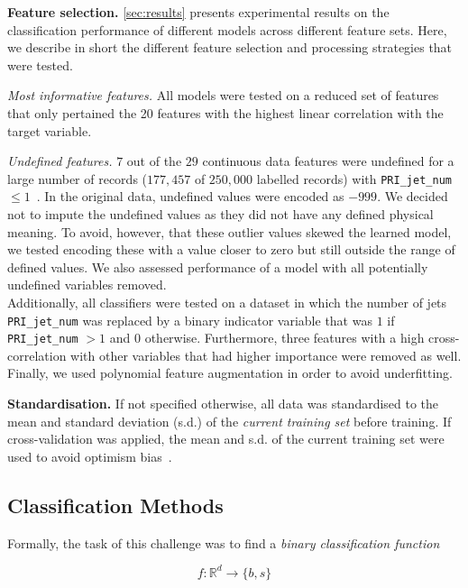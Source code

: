 \documentclass[10pt,conference,compsocconf]{IEEEtran}
\newcommand{\parabf}[1]{\vspace{1mm}\noindent\textbf{#1}}
\newcommand{\parait}[1]{\vspace{1mm}\noindent\textit{#1}}
\newcommand{\targetset}{\{ b, s \}}
\begin{document}
\parabf{Feature selection.} \autoref{sec:results} presents experimental results on the classification performance of different models across different feature sets. Here, we describe in short the different feature selection and processing strategies that were tested.

\parait{Most informative features.} All models were tested on a reduced set of features that only pertained the 20 features with the highest linear correlation with the target variable.

\parait{Undefined features.} $7$ out of the $29$ continuous data features were undefined for a large number of records ($177,457$ of $250,000$ labelled records) with \texttt{PRI\_jet\_num} $\leq 1$~\cite{OpenDataCERN}. In the original data, undefined values were encoded as $-999$. We decided not to impute the undefined values as they did not have any defined physical meaning. To avoid, however, that these outlier values skewed the learned model, we tested encoding these with a value closer to zero but still outside the range of defined values. We also assessed performance of a model with all potentially undefined variables removed.\\
Additionally, all classifiers were tested on a dataset in which the number of jets \texttt{PRI\_jet\_num} was replaced by a binary indicator variable that was $1$ if \texttt{PRI\_jet\_num} $>1$ and $0$ otherwise. Furthermore, three features with a high cross-correlation with other variables that had higher importance were removed as well.
Finally, we used polynomial feature augmentation in order to avoid underfitting.

\parabf{Standardisation.} If not specified otherwise, all data was standardised to the mean and standard deviation (s.d.) of the \emph{current training set} before training. If cross-validation was applied, the mean and s.d. of the current training set were used to avoid optimism bias~\cite{Domingos2012}. 

\subsection{Classification Methods}
Formally, the task of this challenge was to find a \emph{binary classification function}

\vspace*{-4mm}
\begin{equation}
	f: \mathbb{R}^d \rightarrow \targetset
\end{equation}
\end{document}
